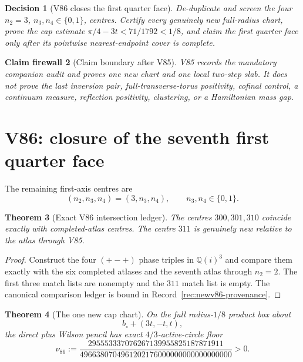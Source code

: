 \documentclass[11pt,oneside]{article}
\newtheorem{theorem}{Theorem}[section]
\newtheorem{firewall}[theorem]{Claim firewall}
\newtheorem{decision}[theorem]{Decision}
\theoremstyle{definition}
\theoremstyle{remark}
\begin{document}
\begin{decision}[V86 closes the first quarter face]
\label{dec:newv85-next}
De-duplicate and screen the four \(n_2=3\),
\(n_3,n_4\in\{0,1\}\), centres.  Certify every genuinely new
full-radius chart, prove the cap estimate
\(\pi/4-3t<71/1792<1/8\), and claim the first quarter face only
after its pointwise nearest-endpoint cover is complete.
\end{decision}

\begin{firewall}[Claim boundary after V85]
\label{fire:newv85-final}
V85 records the mandatory companion audit and proves one new chart
and one local two-step slab.  It does not prove the last inversion
pair, full-transverse-torus positivity, cofinal control, a continuum
measure, reflection positivity, clustering, or a Hamiltonian mass
gap.
\end{firewall}

\section{V86: closure of the seventh first quarter face}
\label{sec:newv86-seventh-first-face}

The remaining first-axis centres are
\[
 (n_2,n_3,n_4)=(3,n_3,n_4),\qquad n_3,n_4\in\{0,1\}.
                                                               \tag{86.1}
\]

\begin{theorem}[Exact V86 intersection ledger]
\label{thm:newv86-intersection}
The centres \(300,301,310\) coincide exactly with completed-atlas
centres.  The centre \(311\) is genuinely new relative to the atlas
through V85.
\end{theorem}

\begin{proof}
Construct the four \((+-+)\) phase triples in \(\mathbb Q(i)^3\)
and compare them exactly with the six completed atlases and the
seventh atlas through \(n_2=2\).  The first three match lists are
nonempty and the \(311\) match list is empty.  The canonical
comparison ledger is bound in
Record~\ref{rec:newv86-provenance}.
\end{proof}

\begin{theorem}[The one new cap chart]
\label{thm:newv86-new-chart}
On the full radius-\(1/8\) product box about
\[
 b_\circ+(3t,-t,t),                                   \tag{86.2}
\]
the direct plus Wilson pencil has exact \(4/3\)-active-circle floor
\[
\nu_{86}:=
\frac{295553337076267139955825187871911}
     {4966380704961202176000000000000000000}>0.        \tag{86.3}
\]
\end{theorem}
\end{document}
